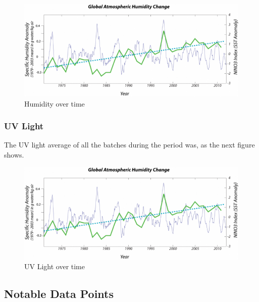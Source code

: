 \documentclass[daily]{engenius}
\begin{document}
\begin{figure}[!ht]
    \begin{center}
        \includegraphics[width=\textwidth/3]{../images/humidity_example.png}
        \caption{Humidity over time}
        \label{img:engeniuslogo}
    \end{center}
\end{figure}


\subsubsection{UV Light}

The UV light average of all the batches during the period was, as the next figure shows.

\begin{figure}[!ht]
    \begin{center}
        \includegraphics[width=\textwidth/3]{../images/humidity_example.png}
        \caption{UV Light over time}
        \label{img:engeniuslogo}
    \end{center}
\end{figure}


\subsection{Notable Data Points}
\end{document}
